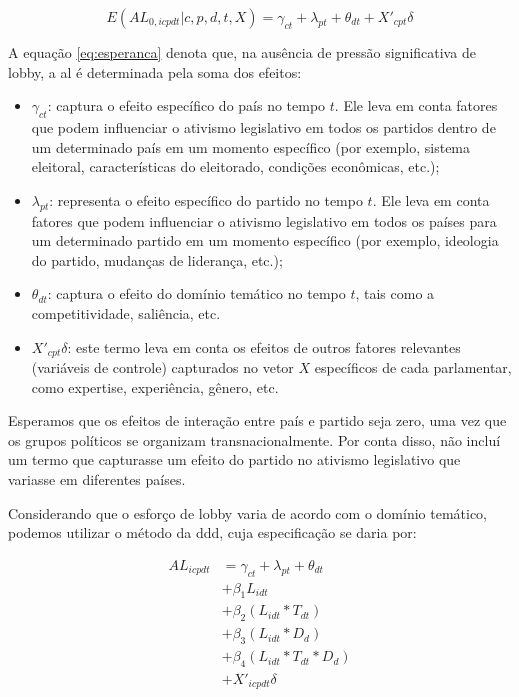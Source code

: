 \begin{equation}
    \label{eq:esperanca}
    E(AL_{0,icpdt} \vert c,p,d,t,X) = \gamma_{ct} + \lambda_{pt} + \theta_{dt} + X'_{cpt} \delta
\end{equation}

A equação \ref{eq:esperanca} denota que, na ausência de pressão significativa de lobby, a \acrshort{al} é determinada pela soma dos efeitos:
\begin{itemize}
    \item $\gamma_{ct}$: captura o efeito específico do país no tempo $t$. Ele leva em conta fatores que podem influenciar o ativismo legislativo em todos os partidos dentro de um determinado país em um momento específico (por exemplo, sistema eleitoral, características do eleitorado, condições econômicas, etc.);
    \item $\lambda_{pt}$: representa o efeito específico do partido no tempo $t$. Ele leva em conta fatores que podem influenciar o ativismo legislativo em todos os países para um determinado partido em um momento específico (por exemplo, ideologia do partido, mudanças de liderança, etc.);
    \item $\theta_{dt}$: captura o efeito do domínio temático no tempo $t$, tais como a competitividade, saliência, etc.
    \item $X'_{cpt} \delta$: este termo leva em conta os efeitos de outros fatores relevantes (variáveis de controle) capturados no vetor $X$ específicos de cada parlamentar, como expertise, experiência, gênero, etc.
\end{itemize}

Esperamos que os efeitos de interação entre país e partido seja zero, uma vez que os grupos políticos se organizam transnacionalmente. Por conta disso, não incluí um termo que capturasse um efeito do partido no ativismo legislativo que variasse em diferentes países. 

Considerando que o esforço de lobby varia de acordo com o domínio temático, podemos utilizar o método da \acrfull{ddd}, cuja especificação se daria por:

\begin{equation}
    \begin{split}
        AL_{icpdt} &= \gamma_{ct} + \lambda_{pt} + \theta_{dt}\\
        &+ \beta_1 L_{idt}\\
        &+ \beta_2 (L_{idt} * T_{dt})\\
        &+ \beta_3 (L_{idt} * D_d)\\
        &+ \beta_4 (L_{idt} * T_{dt} * D_d)\\
        &+ X'_{icpdt} \delta
    \end{split}
\end{equation}

